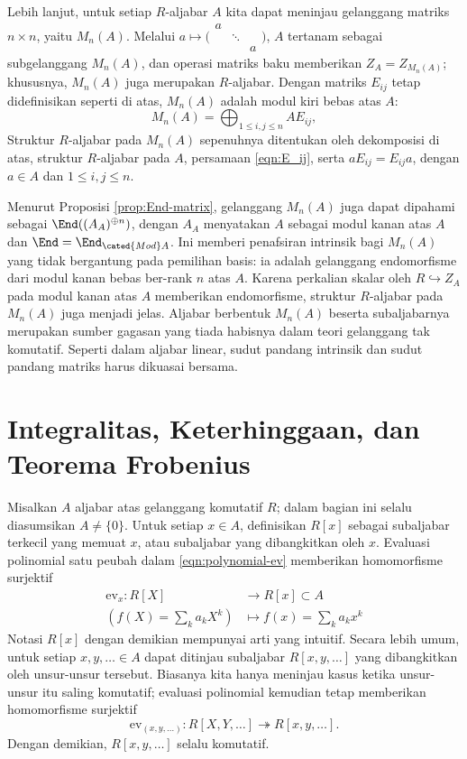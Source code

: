 Lebih lanjut, untuk setiap $R$-aljabar $A$ kita dapat meninjau gelanggang matriks $n \times n$, yaitu $M_n(A)$. Melalui $a \mapsto \biggl( \begin{smallmatrix} a & & \\ & \ddots & \\ & & a \end{smallmatrix} \biggr)$, $A$ tertanam sebagai subgelanggang $M_n(A)$, dan operasi matriks baku memberikan $Z_A = Z_{M_n(A)}$; khususnya, $M_n(A)$ juga merupakan $R$-aljabar. Dengan matriks $E_{ij}$ tetap didefinisikan seperti di atas, $M_n(A)$ adalah modul kiri bebas atas $A$:
\[ M_n(A) = \bigoplus_{1 \leq i,j \leq n} A E_{ij}, \]
Struktur $R$-aljabar pada $M_n(A)$ sepenuhnya ditentukan oleh dekomposisi di atas, struktur $R$-aljabar pada $A$, persamaan \eqref{eqn:E_ij}, serta $a E_{ij} = E_{ij} a$, dengan $a \in A$ dan $1 \leq i,j \leq n$.

Menurut Proposisi \ref{prop:End-matrix}, gelanggang $M_n(A)$ juga dapat dipahami sebagai $\End((A_A)^{\oplus n})$, dengan $A_A$ menyatakan $A$ sebagai modul kanan atas $A$ dan $\End = \End_{\cated{Mod}A}$. Ini memberi penafsiran intrinsik bagi $M_n(A)$ yang tidak bergantung pada pemilihan basis: ia adalah gelanggang endomorfisme dari modul kanan bebas ber-rank $n$ atas $A$. Karena perkalian skalar oleh $R \hookrightarrow Z_A$ pada modul kanan atas $A$ memberikan endomorfisme, struktur $R$-aljabar pada $M_n(A)$ juga menjadi jelas. Aljabar berbentuk $M_n(A)$ beserta subaljabarnya merupakan sumber gagasan yang tiada habisnya dalam teori gelanggang tak komutatif. Seperti dalam aljabar linear, sudut pandang intrinsik dan sudut pandang matriks harus dikuasai bersama.

\section{Integralitas, Keterhinggaan, dan Teorema Frobenius}\label{sec:integrality-finiteness}
Misalkan $A$ aljabar atas gelanggang komutatif $R$; dalam bagian ini selalu diasumsikan $A \neq \{0\}$. Untuk setiap $x \in A$, definisikan $R[x]$ sebagai subaljabar terkecil yang memuat $x$, atau subaljabar yang dibangkitkan oleh $x$. Evaluasi polinomial satu peubah dalam \eqref{eqn:polynomial-ev} memberikan homomorfisme surjektif 
\begin{align*}
	\text{ev}_x: R[X] & \longrightarrow R[x] \subset A \\
	\left( f(X) = \sum_k a_k X^k \right) & \longmapsto f(x) = \sum_k a_k x^k 
\end{align*}
Notasi $R[x]$ dengan demikian mempunyai arti yang intuitif. Secara lebih umum, untuk setiap $x,y, \ldots \in A$ dapat ditinjau subaljabar $R[x,y, \ldots]$ yang dibangkitkan oleh unsur-unsur tersebut. Biasanya kita hanya meninjau kasus ketika unsur-unsur itu saling komutatif; evaluasi polinomial kemudian tetap memberikan homomorfisme surjektif
\[ \text{ev}_{(x,y, \ldots)}: R[X, Y, \ldots] \twoheadrightarrow R[x,y,\ldots]. \]
Dengan demikian, $R[x,y, \ldots]$ selalu komutatif.

